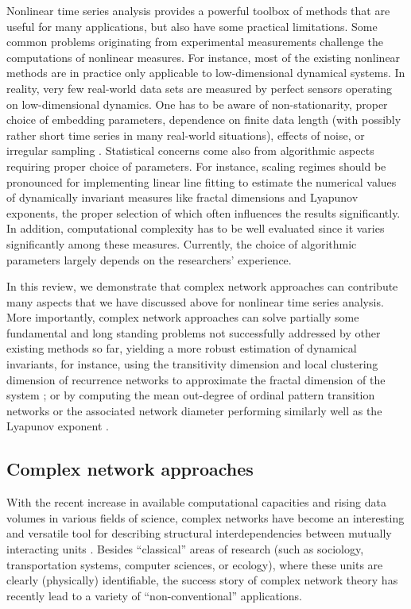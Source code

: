 	Nonlinear time series analysis provides a powerful toolbox of methods that are useful for many applications, but also have some practical limitations. Some common problems originating from experimental measurements challenge the computations of nonlinear measures. For instance, most of the existing nonlinear methods are in practice only applicable to low-dimensional dynamical systems. In reality, very few real-world data sets are measured by perfect sensors operating on low-dimensional dynamics. One has to be aware of non-stationarity, proper choice of embedding parameters, dependence on finite data length (with possibly rather short time series in many real-world situations), effects of noise, or irregular sampling \cite{Bradley2015c}. Statistical concerns come also from algorithmic aspects requiring proper choice of parameters. For instance, scaling regimes should be pronounced for implementing linear line fitting to estimate the numerical values of dynamically invariant measures like fractal dimensions and Lyapunov exponents, the proper selection of which often influences the results significantly. In addition, computational complexity has to be well evaluated since it varies significantly among these measures. Currently, the choice of algorithmic parameters largely depends on the researchers' experience. 

	In this review, we demonstrate that complex network approaches can contribute many aspects that we have discussed above for nonlinear time series analysis. More importantly, complex network approaches can solve partially some fundamental and long standing problems not successfully addressed by other existing methods so far, yielding a more robust estimation of dynamical invariants, for instance, using the transitivity dimension and local clustering dimension of recurrence networks to approximate the fractal dimension of the system \cite{Donner2011b}; or by computing the mean out-degree of ordinal pattern transition networks or the associated network diameter performing similarly well as the Lyapunov exponent \cite{McCullough2015}. 
	
	\subsection{Complex network approaches}
	With the recent increase in available computational capacities and rising data volumes in various fields of science, complex networks have become an interesting and versatile tool for describing structural interdependencies between mutually interacting units \cite{Albert2002,Boccaletti2006,Costa2007,Newman2003}. Besides ``classical'' areas of research (such as sociology, transportation systems, computer sciences, or ecology), where these units are clearly (physically) identifiable, the success story of complex network theory has recently lead to a variety of ``non-conventional'' applications. 

